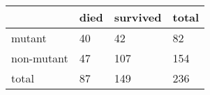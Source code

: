   \begin{tabular}{| l | l | l | l |}
    \hline
     & died & survived & total \\ \hline
    mutant & 40 & 42 & 82  \\ \hline
    non-mutant & 47 & 107 & 154  \\ \hline
    total & 87 & 149 & 236 \\ \hline
    \hline
    \end{tabular}

